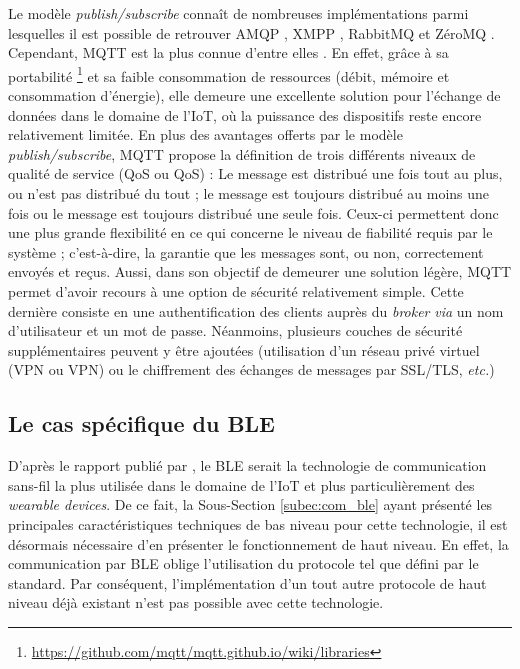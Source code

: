 Le modèle \textit{publish/subscribe} connaît de nombreuses implémentations parmi lesquelles il est possible de retrouver \ac{AMQP} \citep{Vinoski2006}, \ac{XMPP} \citep{Saint-Andre2011}, RabbitMQ \citep{Dossot2014} et ZéroMQ \citep{Hintjens2013}. Cependant, \ac{MQTT} est la plus connue d'entre elles \citep{Hunkeler2008}. En effet, grâce à sa portabilité \footnote{\url{https://github.com/mqtt/mqtt.github.io/wiki/libraries}} et sa faible consommation de ressources (débit, mémoire et consommation d'énergie), elle demeure une excellente solution pour l'échange de données dans le domaine de l'\acs{IoT}, où la puissance des dispositifs reste encore relativement limitée. En plus des avantages offerts par le modèle \textit{publish/subscribe}, \acs{MQTT} propose la définition de trois différents niveaux de qualité de service (\acl{QoS} ou \acs{QoS}) : Le message est distribué une fois tout au plus, ou n'est pas distribué du tout ; le message est toujours distribué au moins une fois ou le message est toujours distribué une seule fois. Ceux-ci permettent donc une plus grande flexibilité en ce qui concerne le niveau de fiabilité requis par le système ; c'est-à-dire, la garantie que les messages sont, ou non, correctement envoyés et reçus. Aussi, dans son objectif de demeurer une solution légère, \acs{MQTT} permet d'avoir recours à une option de sécurité relativement simple. Cette dernière consiste en une authentification des clients auprès du \textit{broker} \textit{via} un nom d'utilisateur et un mot de passe. Néanmoins, plusieurs couches de sécurité supplémentaires peuvent y être ajoutées (utilisation d'un réseau privé virtuel (\acl{VPN} ou \acs{VPN}) ou le chiffrement des échanges de messages par \acs{SSL}/\acs{TLS}, \textit{etc.})

\subsection{Le cas spécifique du \acs{BLE}}

D'après le rapport publié par \cite{ON2017}, le \ac{BLE} serait la technologie de communication sans-fil la plus utilisée dans le domaine de l'\acs{IoT} et plus particulièrement des \textit{wearable devices}. De ce fait, la Sous-Section \ref{subec:com_ble} ayant présenté les principales caractéristiques techniques de bas niveau pour cette technologie, il est désormais nécessaire d'en présenter le fonctionnement de haut niveau. En effet, la communication par \acs{BLE} oblige l'utilisation du protocole tel que défini par le standard. Par conséquent, l'implémentation d'un tout autre protocole de haut niveau déjà existant n'est pas possible avec cette technologie.

